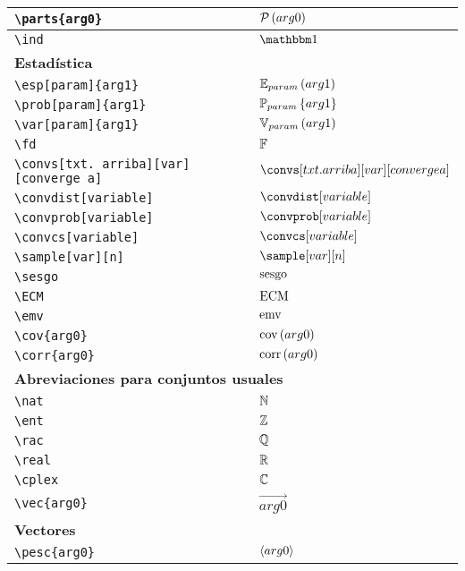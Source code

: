 \begin{longtable}{|p{3.5cm}|p{2cm}|}
\verb|\parts{arg0}| & $\displaystyle\mathcal{P}\left(arg0\right)$ \\ \midrule 
\verb|\ind| & $\displaystyle\ind$ \\ \midrule 
\bottomrule \multicolumn{2}{|p{5.5cm}|}{\textbf{Estadística}} \\ \toprule 
\verb|\esp[param]{arg1}| & $\displaystyle\esp[param]{arg1}$ \\ \midrule 
\verb|\prob[param]{arg1}| & $\displaystyle\prob[param]{arg1}$ \\ \midrule 
\verb|\var[param]{arg1}| & $\displaystyle\var[param]{arg1}$ \\ \midrule 
\verb|\fd| & $\displaystyle\mathbb{F}$ \\ \midrule 
\verb|\convs[txt. arriba][var][converge a]| & $\displaystyle\convs[txt. arriba][var][converge a]$ \\ \midrule 
\verb|\convdist[variable]| & $\displaystyle\convdist[variable]$ \\ \midrule 
\verb|\convprob[variable]| & $\displaystyle\convprob[variable]$ \\ \midrule 
\verb|\convcs[variable]| & $\displaystyle\convcs[variable]$ \\ \midrule 
\verb|\sample[var][n]| & $\displaystyle\sample[var][n]$ \\ \midrule 
\verb|\sesgo| & $\displaystyle\operatorname{sesgo}$ \\ \midrule 
\verb|\ECM| & $\displaystyle\operatorname{ECM}$ \\ \midrule 
\verb|\emv| & $\displaystyle\operatorname{emv}$ \\ \midrule 
\verb|\cov{arg0}| & $\displaystyle\mathrm{cov}\left(arg0\right)$ \\ \midrule 
\verb|\corr{arg0}| & $\displaystyle\mathrm{corr}\left(arg0\right)$ \\ \midrule 
\bottomrule \multicolumn{2}{|p{5.5cm}|}{\textbf{Abreviaciones para conjuntos usuales}} \\ \toprule 
\verb|\nat| & $\displaystyle\mathbb{N}$ \\ \midrule 
\verb|\ent| & $\displaystyle\mathbb{Z}$ \\ \midrule 
\verb|\rac| & $\displaystyle\mathbb{Q}$ \\ \midrule 
\verb|\real| & $\displaystyle\mathbb{R}$ \\ \midrule 
\verb|\cplex| & $\displaystyle\mathbb{C}$ \\ \midrule 
\verb|\vec{arg0}| & $\displaystyle\vec{arg0}$ \\ \midrule 
\bottomrule \multicolumn{2}{|p{5.5cm}|}{\textbf{Vectores}} \\ \toprule 
\verb|\pesc{arg0}| & $\displaystyle\langle arg0 \rangle$ \\ \midrule 

\end{longtable}
